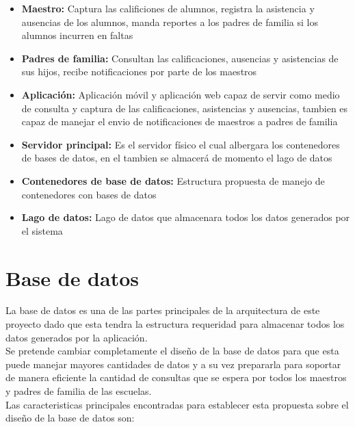     \begin{itemize}
    
        \item \textbf{Maestro:} Captura las calificiones de alumnos, registra la asistencia y ausencias de los alumnos, manda reportes a los padres de familia si los alumnos incurren en faltas
        
        \item \textbf{Padres de familia:} Consultan las calificaciones, ausencias y asistencias de sus hijos, recibe notificaciones por parte de los maestros
        
        \item \textbf{Aplicación:} Aplicación móvil y aplicación web capaz de servir como medio de consulta y captura de las calificaciones, asistencias y ausencias, tambien es capaz de manejar el envio de notificaciones de maestros a padres de familia
        
        \item \textbf{Servidor principal:} Es el servidor físico el cual albergara los contenedores de bases de datos, en el tambien se almacerá de momento el lago de datos
        
        \item \textbf{Contenedores de base de datos:} Estructura propuesta de manejo de contenedores con bases de datos
        
        \item \textbf{Lago de datos:} Lago de datos que almacenara todos los datos generados por el sistema
        
    \end{itemize}
    
    
\section{Base de datos}
    
    La base de datos es una de las partes principales de la arquitectura de este proyecto dado que esta tendra la estructura requeridad para almacenar todos los datos generados por la aplicación. \\ Se pretende cambiar completamente el diseño de la base de datos para que esta puede manejar mayores cantidades de datos y a su vez prepararla para soportar de manera eficiente la cantidad de consultas que se espera por todos los maestros y padres de familia de las escuelas. \\ Las caracteristicas principales encontradas para establecer esta propuesta sobre el diseño de la base de datos son:
    
